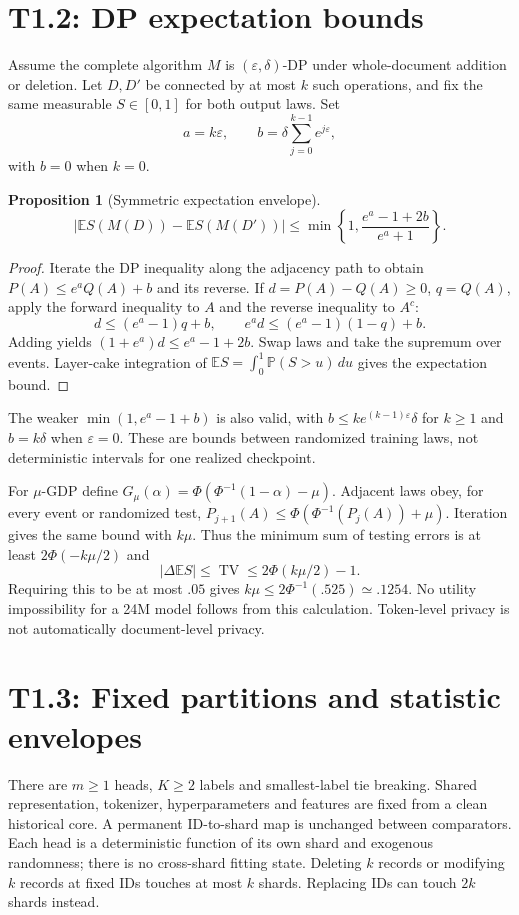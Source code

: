 \documentclass[11pt]{article}
\newtheorem{proposition}{Proposition}
\newcommand{\Prob}{\mathbb P}
\newcommand{\E}{\mathbb E}
\newcommand{\TV}{\operatorname{TV}}
\begin{document}
\section{T1.2: DP expectation bounds}
Assume the complete algorithm $M$ is $(\varepsilon,\delta)$-DP under
whole-document addition or deletion. Let $D,D'$ be connected by at
most $k$ such operations, and fix the same measurable $S\in[0,1]$ for
both output laws. Set
\[
a=k\varepsilon,\qquad b=\delta\sum_{j=0}^{k-1}e^{j\varepsilon},
\]
with $b=0$ when $k=0$.
\begin{proposition}[Symmetric expectation envelope]
\[
|\E S(M(D))-\E S(M(D'))|
\le\min\left\{1,\frac{e^a-1+2b}{e^a+1}\right\}.
\]
\end{proposition}
\begin{proof}
Iterate the DP inequality along the adjacency path to obtain
$P(A)\le e^a Q(A)+b$ and its reverse. If
$d=P(A)-Q(A)\ge0$, $q=Q(A)$, apply the forward inequality to $A$ and
the reverse inequality to $A^c$:
\[
d\le(e^a-1)q+b,\qquad e^a d\le(e^a-1)(1-q)+b.
\]
Adding yields $(1+e^a)d\le e^a-1+2b$. Swap laws and take the
supremum over events. Layer-cake integration of
$\E S=\int_0^1\Prob(S>u)\,du$ gives the expectation bound.
\end{proof}
The weaker $\min(1,e^a-1+b)$ is also valid, with
$b\le k e^{(k-1)\varepsilon}\delta$ for $k\ge1$ and $b=k\delta$
when $\varepsilon=0$. These are bounds between randomized training
laws, not deterministic intervals for one realized checkpoint.

For $\mu$-GDP define
$G_\mu(\alpha)=\Phi(\Phi^{-1}(1-\alpha)-\mu)$.
Adjacent laws obey, for every event or randomized test,
$P_{j+1}(A)\le\Phi(\Phi^{-1}(P_j(A))+\mu)$.
Iteration gives the same bound with $k\mu$. Thus the minimum sum of
testing errors is at least $2\Phi(-k\mu/2)$ and
\[
|\Delta\E S|\le\TV\le2\Phi(k\mu/2)-1.
\]
Requiring this to be at most $.05$ gives
$k\mu\le2\Phi^{-1}(.525)\simeq .1254$.
No utility impossibility for a 24M model follows from this calculation.
Token-level privacy is not automatically document-level privacy.

\section{T1.3: Fixed partitions and statistic envelopes}
There are $m\ge1$ heads, $K\ge2$ labels and smallest-label tie breaking.
Shared representation, tokenizer, hyperparameters and features are fixed
from a clean historical core. A permanent ID-to-shard map is unchanged
between comparators. Each head is a deterministic function of its own
shard and exogenous randomness; there is no cross-shard fitting state.
Deleting $k$ records or modifying $k$ records at fixed IDs touches at
most $k$ shards. Replacing IDs can touch $2k$ shards instead.
\end{document}
